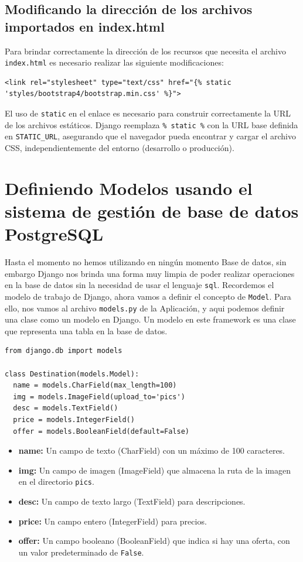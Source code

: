 \documentclass[10pt, a4paper]{article}
\newcommand{\mpy}[1]{\texttt{#1}}
\begin{document}
\subsection{Modificando la dirección de los archivos importados en index.html}
Para brindar correctamente la dirección de los recursos que necesita el archivo \mpy{index.html} es necesario realizar las siguiente modificaciones:

\begin{verbatim}
<link rel="stylesheet" type="text/css" href="{% static 'styles/bootstrap4/bootstrap.min.css' %}">
\end{verbatim}

El uso de \mpy{static} en el enlace es necesario para construir correctamente la URL de los archivos estáticos. Django reemplaza \mpy{{\% static \%}} con la URL base definida en \mpy{STATIC_URL}, asegurando que el navegador pueda encontrar y cargar el archivo CSS, independientemente del entorno (desarrollo o producción).

\section{Definiendo Modelos usando el sistema de gestión de base de datos PostgreSQL}
Hasta el momento no hemos utilizando en ningún momento Base de datos, sin embargo Django nos brinda una forma muy limpia de poder realizar operaciones en la base de datos sin la necesidad de usar el lenguaje \mpy{sql}.
\singlespacing
Recordemos el modelo de trabajo de Django, ahora vamos a definir el concepto de \mpy{Model}. Para ello, nos vamos al archivo \mpy{models.py} de la Aplicación, y aqui podemos definir una clase como un modelo en Django. Un modelo en este framework es una clase que representa una tabla en la base de datos. 

\begin{verbatim}
from django.db import models

class Destination(models.Model):
  name = models.CharField(max_length=100)
  img = models.ImageField(upload_to='pics')
  desc = models.TextField()
  price = models.IntegerField()
  offer = models.BooleanField(default=False)
\end{verbatim}

\begin{itemize}
  \item \textbf{name:} Un campo de texto (CharField) con un máximo de 100 caracteres.
  \item \textbf{img:} Un campo de imagen (ImageField) que almacena la ruta de la imagen en el directorio \mpy{pics}.
  \item \textbf{desc:} Un campo de texto largo (TextField) para descripciones.
  \item \textbf{price:} Un campo entero (IntegerField) para precios.
  \item \textbf{offer:} Un campo booleano (BooleanField) que indica si hay una oferta, con un valor predeterminado de \mpy{False}.
\end{itemize}
\end{document}
